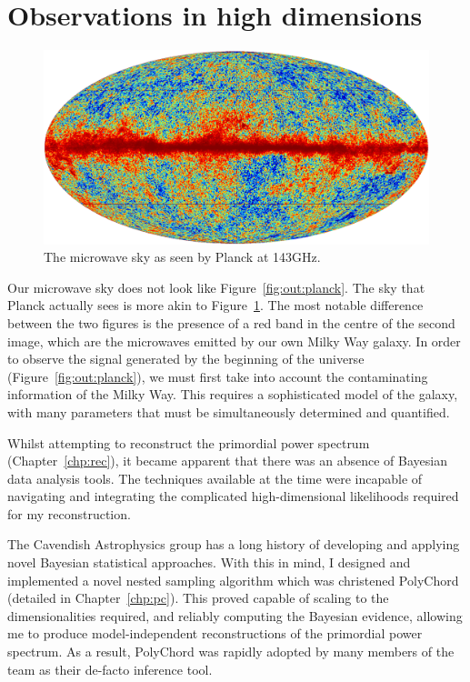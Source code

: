 \section{Observations in high dimensions}
\begin{figure}[tp]
  \includegraphics[width=\textwidth]{chapters/outline/figures/planck_galaxy}
  \caption{The microwave sky as seen by Planck at 143GHz.}\label{fig:out:planck_galaxy}
\end{figure}
Our microwave sky does not look like Figure~\ref{fig:out:planck}. The sky that Planck actually sees is more akin to Figure~\ref{fig:out:planck_galaxy}. The most notable difference between the two figures is the presence of a red band in the centre of the second image, which are the microwaves emitted by our own Milky Way galaxy. In order to observe the signal generated by the beginning of the universe (Figure~\ref{fig:out:planck}), we must first take into account the contaminating information of the Milky Way. This requires a sophisticated model of the galaxy, with many parameters that must be simultaneously determined and quantified. 

Whilst attempting to reconstruct the primordial power spectrum (Chapter~\ref{chp:rec}), it became apparent that there was an absence of Bayesian data analysis tools. The techniques available at the time were incapable of navigating and integrating the complicated high-dimensional likelihoods required for my reconstruction.

The Cavendish Astrophysics group has a long history of developing and applying novel Bayesian statistical approaches. With this in mind, I designed and implemented a novel nested sampling algorithm which was christened PolyChord (detailed in Chapter~\ref{chp:pc}). This proved capable of scaling to the dimensionalities required, and reliably computing  the Bayesian evidence, allowing me to produce model-independent reconstructions of the primordial power spectrum.
As a result, PolyChord was rapidly adopted by many members of the team as their de-facto inference tool.

